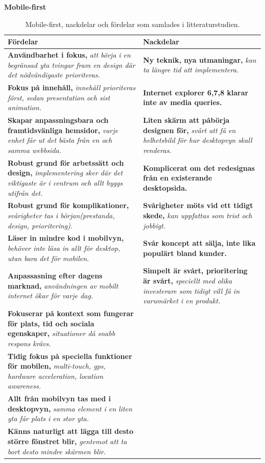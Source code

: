 \documentclass[11pt]{article}
\begin{document}
\textbf{Mobile-first}
\begin{table}[H]
\centering
\begin{tabular}{|p{7.2cm}|p{7.2cm}|}
\hline
Fördelar&Nackdelar\\ \hline
\textbf{Användbarhet i fokus, }\textit{att börja i en begränsad yta tvingar fram en design där det nödvändigaste prioriteras.}&\textbf{Ny teknik, nya utmaningar,} \textit{kan ta längre tid att implementera.}\\ \hline
\textbf{Fokus på innehåll, }\textit{innehåll prioriteras först, sedan presentation och sist animation.}&\textbf{Internet explorer 6,7,8 klarar inte av media queries.} \\ \hline
\textbf{Skapar anpassningsbara och framtidsvänliga hemsidor, }\textit{varje enhet får ut det bästa från en och samma webbsida.}&\textbf{Liten skärm att påbörja designen för, } \textit{svårt att få en helhetsbild för hur desktopvyn skall renderas.}\\ \hline
\textbf{Robust grund för arbetssätt och design, }\textit{implementering sker där det viktigaste är i centrum och allt byggs utifrån det.}&\textbf{Komplicerat om det redesignas från en existerande desktopsida.}\\ \hline
\textbf{Robust grund för komplikationer, }\textit{svårigheter tas i början(prestanda, design, prioritering).}&\textbf{Svårigheter möts vid ett tidigt skede, } \textit{kan uppfattas som trist och jobbigt.}\\ \hline
\textbf{Läser in mindre kod i mobilvyn, }\textit{behöver inte läsa in allt för desktop, utan bara det för mobilen.}&\textbf{Svår koncept att sälja, inte lika populärt bland kunder.}\\ \hline
\textbf{Anpassasning efter dagens marknad, }\textit{användningen av mobilt internet ökar för varje dag.}&\textbf{Simpelt är svårt, prioritering är svårt, } \textit{speciellt med olika investerare som tidigt vill få in varumärket i en produkt.}\\ \hline
\textbf{Fokuserar på kontext som fungerar för plats, tid och sociala egenskaper, }\textit{situationer då snabb respons krävs.}&~\\ \hline
\textbf{Tidig fokus på speciella funktioner för mobilen, }\textit{multi-touch, gps, hardware acceleration, location awareness.}&~\\ \hline
\textbf{Allt från mobilvyn tas med i desktopvyn, }\textit{samma element i en liten yta får plats i en stor yta.}&~\\ \hline
\textbf{Känns naturligt att lägga till desto större fönstret blir, }\textit{gentemot att ta bort desto mindre skärmen blir.}&~\\ \hline

    \end{tabular}
    \caption {Mobile-first, nackdelar och fördelar som samlades i litteraturstudien.}
\end{table}
\newpage
\end{document}
